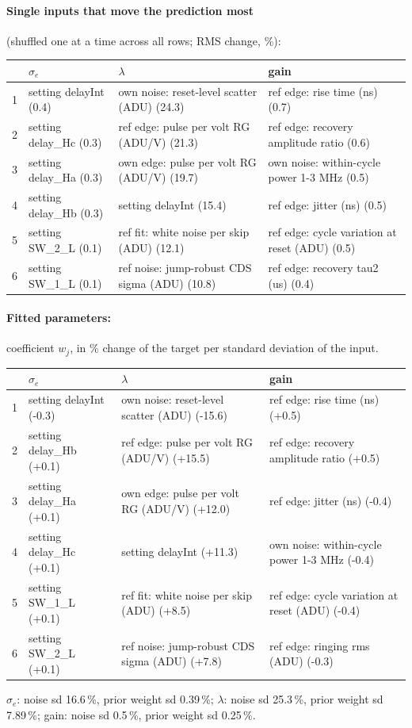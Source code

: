 \paragraph{Single inputs that move the prediction most} (shuffled one at a time across all rows; RMS change, \%):
\begin{center}\footnotesize
\begin{tabular}{rp{}p{}p{}}
\toprule
 & $\sigma_e$ & $\lambda$ & gain \\
\midrule
1 & setting delayInt (0.4) & own noise: reset-level scatter (ADU) (24.3) & ref edge: rise time (ns) (0.7) \\
2 & setting delay\_Hc (0.3) & ref edge: pulse per volt RG (ADU/V) (21.3) & ref edge: recovery amplitude ratio (0.6) \\
3 & setting delay\_Ha (0.3) & own edge: pulse per volt RG (ADU/V) (19.7) & own noise: within-cycle power 1-3 MHz (0.5) \\
4 & setting delay\_Hb (0.3) & setting delayInt (15.4) & ref edge: jitter (ns) (0.5) \\
5 & setting SW\_2\_L (0.1) & ref fit: white noise per skip (ADU) (12.1) & ref edge: cycle variation at reset (ADU) (0.5) \\
6 & setting SW\_1\_L (0.1) & ref noise: jump-robust CDS sigma (ADU) (10.8) & ref edge: recovery tau2 (us) (0.4) \\
\bottomrule
\end{tabular}
\end{center}
\paragraph{Fitted parameters:} coefficient $w_j$, in \% change of the target per standard deviation of the input.
\begin{center}\footnotesize
\begin{tabular}{rp{}p{}p{}}
\toprule
 & $\sigma_e$ & $\lambda$ & gain \\
\midrule
1 & setting delayInt (-0.3) & own noise: reset-level scatter (ADU) (-15.6) & ref edge: rise time (ns) (+0.5) \\
2 & setting delay\_Hb (+0.1) & ref edge: pulse per volt RG (ADU/V) (+15.5) & ref edge: recovery amplitude ratio (+0.5) \\
3 & setting delay\_Ha (+0.1) & own edge: pulse per volt RG (ADU/V) (+12.0) & ref edge: jitter (ns) (-0.4) \\
4 & setting delay\_Hc (+0.1) & setting delayInt (+11.3) & own noise: within-cycle power 1-3 MHz (-0.4) \\
5 & setting SW\_1\_L (+0.1) & ref fit: white noise per skip (ADU) (+8.5) & ref edge: cycle variation at reset (ADU) (-0.4) \\
6 & setting SW\_2\_L (+0.1) & ref noise: jump-robust CDS sigma (ADU) (+7.8) & ref edge: ringing rms (ADU) (-0.3) \\
\bottomrule
\end{tabular}
\end{center}
{\footnotesize $\sigma_e$: noise sd 16.6\,\%, prior weight sd 0.39\,\%; $\lambda$: noise sd 25.3\,\%, prior weight sd 7.89\,\%; gain: noise sd 0.5\,\%, prior weight sd 0.25\,\%.}

